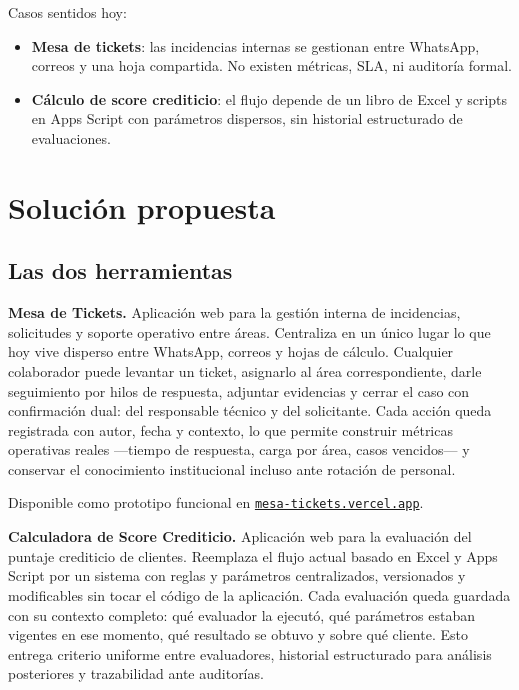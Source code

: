 \documentclass[12pt,a4paper]{article}
\begin{document}
Casos sentidos hoy:

\begin{itemize}
  \item \textbf{Mesa de tickets}: las incidencias internas se gestionan entre WhatsApp,
        correos y una hoja compartida. No existen métricas, SLA, ni auditoría formal.
  \item \textbf{Cálculo de score crediticio}: el flujo depende de un libro de Excel y scripts
        en Apps Script con parámetros dispersos, sin historial estructurado de evaluaciones.
\end{itemize}

\section{Solución propuesta}

\subsection*{Las dos herramientas}

\textbf{Mesa de Tickets.}
Aplicación web para la gestión interna de incidencias, solicitudes
y soporte operativo entre áreas.
Centraliza en un único lugar lo que hoy vive disperso entre WhatsApp,
correos y hojas de cálculo.
Cualquier colaborador puede levantar un ticket,
asignarlo al área correspondiente,
darle seguimiento por hilos de respuesta, adjuntar evidencias
y cerrar el caso con confirmación dual:
del responsable técnico y del solicitante.
Cada acción queda registrada con autor, fecha y contexto,
lo que permite construir métricas operativas reales
---tiempo de respuesta, carga por área, casos vencidos---
y conservar el conocimiento institucional incluso ante rotación de personal.

Disponible como prototipo funcional en
\href{https://mesa-tickets.vercel.app}{\texttt{mesa-tickets.vercel.app}}.

\textbf{Calculadora de Score Crediticio.}
Aplicación web para la evaluación del puntaje crediticio de clientes.
Reemplaza el flujo actual basado en Excel y Apps Script
por un sistema con reglas y parámetros centralizados,
versionados y modificables sin tocar el código de la aplicación.
Cada evaluación queda guardada con su contexto completo:
qué evaluador la ejecutó, qué parámetros estaban vigentes en ese momento,
qué resultado se obtuvo y sobre qué cliente.
Esto entrega criterio uniforme entre evaluadores,
historial estructurado para análisis posteriores
y trazabilidad ante auditorías.
\end{document}
